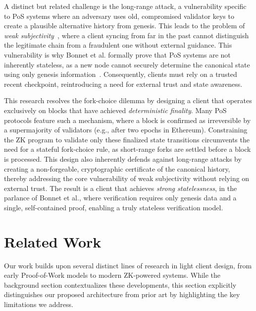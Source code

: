 \documentclass[runningheads]{llncs}
\begin{document}
A distinct but related challenge is the long-range attack, a vulnerability specific to PoS systems where an adversary uses old, compromised validator keys to create a plausible alternative history from genesis. This leads to the problem of \textit{weak subjectivity~\cite{Chatzigiannis2021SoK}}, where a client syncing from far in the past cannot distinguish the legitimate chain from a fraudulent one without external guidance. This vulnerability is why Bonnet et al. formally prove that PoS systems are not inherently stateless, as a new node cannot securely determine the canonical state using only genesis information~\cite{Bonnet2020Stateless}. Consequently, clients must rely on a trusted recent checkpoint, reintroducing a need for external trust and state awareness.

This research resolves the fork-choice dilemma by designing a client that operates exclusively on blocks that have achieved \textit{deterministic finality}. Many PoS protocols feature such a mechanism, where a block is confirmed as irreversible by a supermajority of validators (e.g., after two epochs in Ethereum). Constraining the ZK program to validate only these finalized state transitions circumvents the need for a stateful fork-choice rule, as short-range forks are settled before a block is processed. This design also inherently defends against long-range attacks by creating a non-forgeable, cryptographic certificate of the canonical history, thereby addressing the core vulnerability of weak subjectivity without relying on external trust. The result is a client that achieves \textit{strong statelessness}, in the parlance of Bonnet et al., where verification requires only genesis data and a single, self-contained proof, enabling a truly stateless verification model.

\section{Related Work}
\label{sec:related_work}

Our work builds upon several distinct lines of research in light client design, from early Proof-of-Work models to modern ZK-powered systems. While the background section contextualizes these developments, this section explicitly distinguishes our proposed architecture from prior art by highlighting the key limitations we address.
\end{document}
